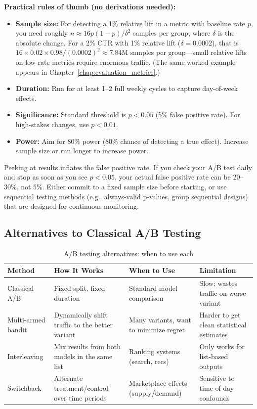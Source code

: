 \textbf{Practical rules of thumb (no derivations needed):}
\begin{itemize}
    \item \textbf{Sample size:} For detecting a 1\% relative lift in a metric with baseline rate $p$, you need roughly $n \approx 16 p(1-p) / \delta^2$ samples per group, where $\delta$ is the absolute change. For a 2\% CTR with 1\% relative lift ($\delta = 0.0002$), that is $16 \times 0.02 \times 0.98 / (0.0002)^2 \approx 7.84$M samples per group---small relative lifts on low-rate metrics require enormous traffic. (The same worked example appears in Chapter~\ref{chap:evaluation_metrics}.)
    \item \textbf{Duration:} Run for at least 1--2 full weekly cycles to capture day-of-week effects.
    \item \textbf{Significance:} Standard threshold is $p < 0.05$ (5\% false positive rate). For high-stakes changes, use $p < 0.01$.
    \item \textbf{Power:} Aim for 80\% power (80\% chance of detecting a true effect). Increase sample size or run longer to increase power.
\end{itemize}

\begin{warningbox}
Peeking at results inflates the false positive rate. If you check your A/B test daily and stop as soon as you see $p < 0.05$, your actual false positive rate can be 20--30\%, not 5\%. Either commit to a fixed sample size before starting, or use sequential testing methods (e.g., always-valid p-values, group sequential designs) that are designed for continuous monitoring.
\end{warningbox}

\subsection{Alternatives to Classical A/B Testing}

\begin{table}[H]
\centering
\caption{A/B testing alternatives: when to use each}
\begin{tabularx}{\textwidth}{lXXX}
\toprule
\textbf{Method} & \textbf{How It Works} & \textbf{When to Use} & \textbf{Limitation} \\
\midrule
Classical A/B & Fixed split, fixed duration & Standard model comparison & Slow; wastes traffic on worse variant \\
Multi-armed bandit & Dynamically shift traffic to the better variant & Many variants, want to minimize regret & Harder to get clean statistical estimates \\
Interleaving & Mix results from both models in the same list & Ranking systems (search, recs) & Only works for list-based outputs \\
Switchback & Alternate treatment/control over time periods & Marketplace effects (supply/demand) & Sensitive to time-of-day confounds \\
\bottomrule
\end{tabularx}
\end{table}

